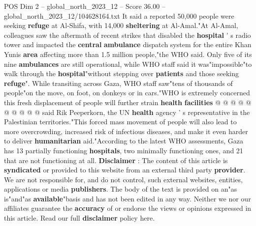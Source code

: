 \begin{textsample}{POS Dim 2 – global\_north\_2023\_12 – Score 36.00 – global\_north\_2023\_12/104628164.txt}
It said a reported 50,000 people were seeking \textbf{refuge} at Al-Shifa, with 14,000 \textbf{sheltering} at Al-Amal."At Al-Amal, colleagues saw the aftermath of recent strikes that disabled the \textbf{hospital} ' s radio tower and impacted the \textbf{central} \textbf{ambulance} dispatch system for the entire Khan Yunis \textbf{area} affecting more than 1.5 million people,"the WHO said.
Only five of its nine \textbf{ambulances} are still operational, while WHO staff said it was"impossible"to walk through the \textbf{hospital}"without stepping over \textbf{patients} and those seeking \textbf{refuge}".
While transiting across Gaza, WHO staff saw"tens of thousands of people"on the move, on foot, on donkeys or in cars."WHO is extremely concerned this fresh displacement of people will further strain \textbf{health} \textbf{facilities} @ @ @ @ @ @ @ @ @ @ said Rik Peeperkorn, the UN \textbf{health} agency ' s representative in the Palestinian territories."This forced mass movement of people will also lead to more overcrowding, increased risk of infectious diseases, and make it even harder to deliver \textbf{humanitarian} aid."According to the latest WHO assessments, Gaza has 13 partially functioning \textbf{hospitals}, two minimally functioning ones, and 21 that are not functioning at all. \textbf{Disclaimer} : The content of this article is \textbf{syndicated} or provided to this website from an external third party \textbf{provider}.
We are not responsible for, and do not control, such external websites, entities, applications or media \textbf{publishers}.
The body of the text is provided on an"as is"and"as \textbf{available}"basis and has not been edited in any way.
Neither we nor our affiliates guarantee the \textbf{accuracy} of or endorse the views or opinions expressed in this article.
Read our full \textbf{disclaimer} policy here.

\end{textsample}
